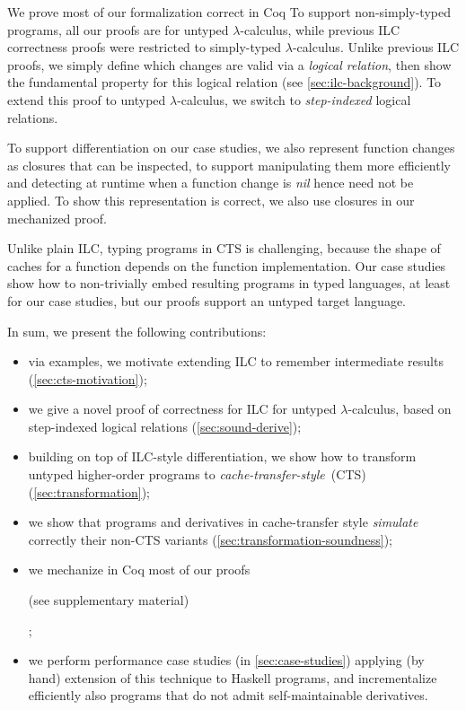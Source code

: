 We prove most of our formalization correct in Coq
To support non-simply-typed programs, all our proofs
are for untyped $\lambda$-calculus, while previous ILC correctness proofs were
restricted to simply-typed $\lambda$-calculus.
Unlike previous ILC proofs, we simply define which changes are valid
via a \emph{logical relation}, then show the fundamental property for this
logical relation (see \cref{sec:ilc-background}). To extend this proof to
untyped $\lambda$-calculus, we switch to \emph{step-indexed} logical relations.

To support differentiation on our case studies, we also represent function changes
as closures that can be inspected, to support manipulating them more efficiently
and detecting at runtime when a function change is \emph{nil} hence need not be
applied. To show this representation is correct, we also use closures in our
mechanized proof.

Unlike plain ILC, typing programs in CTS is challenging, because the shape of
caches for a function depends on the function implementation.
Our case studies show how to non-trivially embed resulting programs in typed
languages, at least for our case studies, but our proofs support an untyped
target language.

In sum, we present the following contributions:
\begin{itemize}
\item via examples, we motivate extending ILC to remember intermediate
  results (\cref{sec:cts-motivation});
\item we give a novel proof of correctness for ILC for untyped
  $\lambda$-calculus, based on step-indexed logical relations
  (\cref{sec:sound-derive});
\item building on top of ILC-style differentiation, we show how to transform
  untyped higher-order programs to \emph{cache-transfer-style}~(CTS)~%
  (\cref{sec:transformation});
\item we show that programs and derivatives in cache-transfer style
  \emph{simulate} correctly their non-CTS variants (\cref{sec:transformation-soundness});
\item we mechanize in Coq most of our proofs%
\begin{poplForPopl}
 (see supplementary material)%
\end{poplForPopl}
;
\item we perform performance case studies (in \cref{sec:case-studies}) applying
  (by hand) extension of this technique to Haskell programs, and incrementalize
  efficiently also programs that do not admit self-maintainable derivatives.
\end{itemize}

